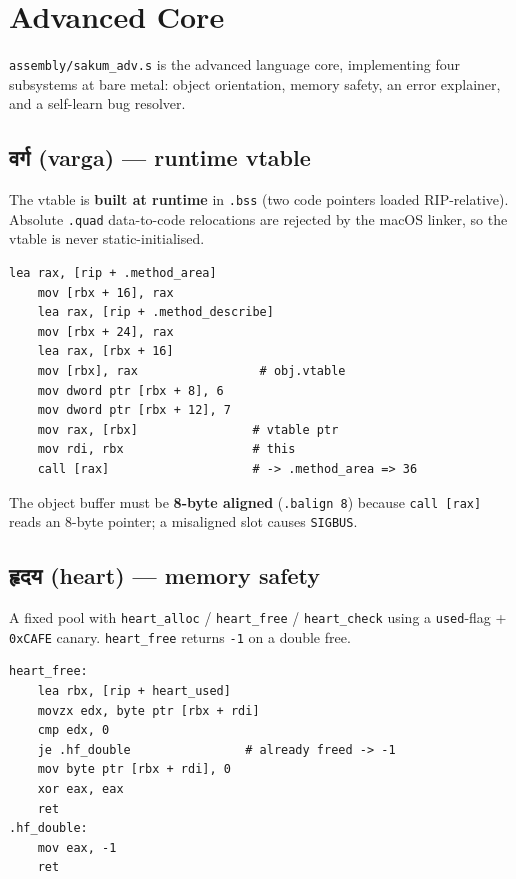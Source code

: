 \section{Advanced Core}\label{ch:adv}

\texttt{assembly/sakum\_adv.s} is the advanced language core, implementing
four subsystems at bare metal: object orientation, memory safety, an error
explainer, and a self-learn bug resolver.

\subsection{वर्ग (varga) --- runtime vtable}

The vtable is \textbf{built at runtime} in \texttt{.bss} (two code pointers
loaded RIP-relative).  Absolute \texttt{.quad} data-to-code relocations are
rejected by the macOS linker, so the vtable is never static-initialised.

\begin{lstlisting}[language=SakumAsm,caption={vtable build + virtual dispatch (sakum\_adv.s:62).}]
    lea rax, [rip + .method_area]
    mov [rbx + 16], rax
    lea rax, [rip + .method_describe]
    mov [rbx + 24], rax
    lea rax, [rbx + 16]
    mov [rbx], rax                 # obj.vtable
    mov dword ptr [rbx + 8], 6
    mov dword ptr [rbx + 12], 7
    mov rax, [rbx]                # vtable ptr
    mov rdi, rbx                  # this
    call [rax]                    # -> .method_area => 36
\end{lstlisting}

The object buffer must be \textbf{8-byte aligned} (\texttt{.balign 8}) because
\texttt{call [rax]} reads an 8-byte pointer; a misaligned slot causes
\texttt{SIGBUS}.

\subsection{हृदय (heart) --- memory safety}

A fixed pool with \texttt{heart\_alloc} / \texttt{heart\_free} /
\texttt{heart\_check} using a \texttt{used}-flag + \texttt{0xCAFE} canary.
\texttt{heart\_free} returns \texttt{-1} on a double free.

\begin{lstlisting}[language=SakumAsm,caption={Double-free guard (sakum\_adv.s:109).}]
heart_free:
    lea rbx, [rip + heart_used]
    movzx edx, byte ptr [rbx + rdi]
    cmp edx, 0
    je .hf_double                # already freed -> -1
    mov byte ptr [rbx + rdi], 0
    xor eax, eax
    ret
.hf_double:
    mov eax, -1
    ret
\end{lstlisting}

